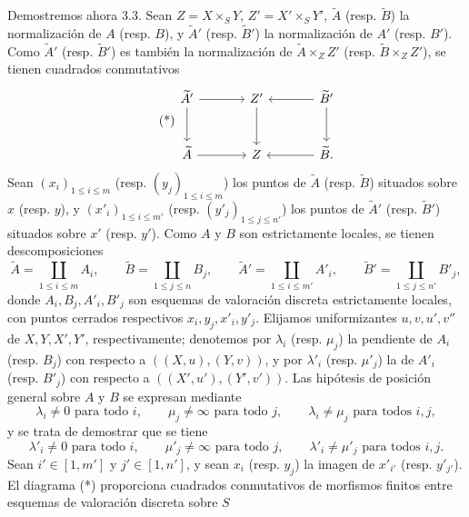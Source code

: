 Demostremos ahora 3.3. Sean $Z=X\times_SY$, $Z'=X'\times_SY'$, $\widetilde A$ (resp. $\widetilde B$) la normalización de $A$ (resp. $B$), y $\widetilde A'$ (resp. $\widetilde B'$) la normalización de $A'$ (resp. $B'$). Como $\widetilde A'$ (resp. $\widetilde B'$) es también la normalización de $\widetilde A\times_ZZ'$ (resp. $\widetilde B\times_ZZ'$), se tienen cuadrados conmutativos
\begin{equation}
\tag{*}
\begin{tikzcd}[column sep=large,row sep=large]
\widetilde A' \arrow[r] \arrow[d] & Z' \arrow[d] & \widetilde B' \arrow[l] \arrow[d]\\
\widetilde A \arrow[r] & Z & \widetilde B . \arrow[l]
\end{tikzcd}
\end{equation}
Sean $(x_i)_{1\le i\le m}$ (resp. $(y_j)_{1\le i\le m}$) los puntos de $\widetilde A$ (resp. $\widetilde B$) situados sobre $x$ (resp. $y$), y $(x'_i)_{1\le i\le m'}$ (resp. $(y'_j)_{1\le j\le n'}$) los puntos de $\widetilde A'$ (resp. $\widetilde B'$) situados sobre $x'$ (resp. $y'$). Como $A$ y $B$ son estrictamente locales, se tienen descomposiciones
\[
\widetilde A=\coprod_{1\le i\le m}A_i,\qquad
\widetilde B=\coprod_{1\le j\le n}B_j,\qquad
\widetilde A'=\coprod_{1\le i\le m'}A'_i,\qquad
\widetilde B'=\coprod_{1\le j\le n'}B'_j,
\]
donde $A_i,B_j,A'_i,B'_j$ son esquemas de valoración discreta estrictamente locales, con puntos cerrados respectivos $x_i,y_j,x'_i,y'_j$. Elijamos uniformizantes $u,v,u',v''$ de $X,Y,X',Y'$, respectivamente; denotemos por $\lambda_i$ (resp. $\mu_j$) la pendiente de $A_i$ (resp. $B_j$) con respecto a $((X,u),(Y,v))$, y por $\lambda'_i$ (resp. $\mu'_j$) la de $A'_i$ (resp. $B'_j$) con respecto a $((X',u'),(Y',v'))$. Las hipótesis de posición general sobre $A$ y $B$ se expresan mediante
\begin{equation}
\lambda_i\ne0\text{ para todo }i,\qquad
\mu_j\ne\infty\text{ para todo }j,\qquad
\lambda_i\ne\mu_j\text{ para todos }i,j,
\tag{1}
\end{equation}
y se trata de demostrar que se tiene
\begin{equation}
\lambda'_i\ne0\text{ para todo }i,\qquad
\mu'_j\ne\infty\text{ para todo }j,\qquad
\lambda'_i\ne\mu'_j\text{ para todos }i,j.
\tag{2}
\end{equation}
Sean $i'\in[1,m']$ y $j'\in[1,n']$, y sean $x_i$ (resp. $y_j$) la imagen de $x'_{i'}$ (resp. $y'_{j'}$). El diagrama (*) proporciona cuadrados conmutativos de morfismos finitos entre esquemas de valoración discreta sobre $S$
